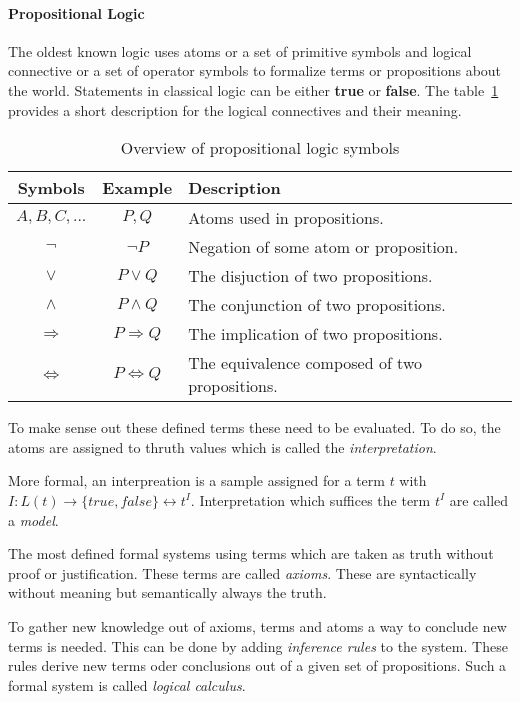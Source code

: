 \paragraph{Propositional Logic}
The oldest known logic uses atoms or a set of primitive symbols and logical
connective or a set of operator symbols to formalize
terms or propositions about the world. Statements in classical logic can be either
\textbf{true} or \textbf{false}. The table~\ref{tab:proplogic} provides
a short description for the logical connectives and their meaning.~\cite{heinemann2013logik}

\begin{table}[h]
  \centering
  \begin{tabular}{c|c|l}
    Symbols & Example & Description\\\hline
    $A,B,C,...$ & $P, Q$ & Atoms used in propositions.\\
    $\neg$ & $\neg P$ & Negation of some atom or proposition.\\
    $\vee$ & $P \vee Q$ & The disjuction of two propositions.\\
    $\wedge$ & $P \wedge Q$ & The conjunction of two propositions.\\
    $\Rightarrow$ & $P \Rightarrow Q$ & The implication of two propositions.\\
    $\Leftrightarrow$ & $P \Leftrightarrow Q$ & The equivalence composed of two propositions.\\
  \end{tabular}
  \caption{Overview of propositional logic symbols}
  \label{tab:proplogic}
\end{table}

To make sense out these defined terms these need to be evaluated. To do so,
the atoms are assigned to thruth values which is called the \textit{interpretation}.~\cite{tuschik1994mathematische}

\begin{defi}
  More formal, an interpreation is a sample assigned for a term $t$ with
  $I:L(t)\rightarrow \{true,false\} \leftrightarrow t^I$. Interpretation which suffices the term
  $t^I$ are called a \textit{model}.
\end{defi}

The most defined formal systems using terms which are taken as truth without
proof or justification. These terms are called \textit{axioms}. These are syntactically
without meaning but semantically always the truth.~\cite{tuschik1994mathematische}

To gather new knowledge out of axioms, terms and atoms a way to conclude
new terms is needed. This can be done by adding \textit{inference rules} to
the system. These rules derive new terms oder conclusions out of a given
set of propositions. Such a formal system is called \textit{logical calculus}.~\cite{tuschik1994mathematische}


